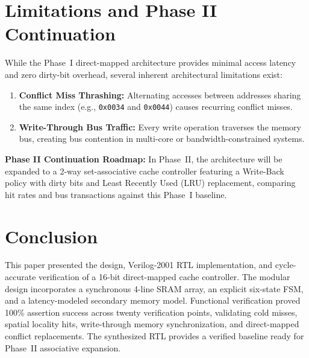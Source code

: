 \documentclass[conference]{IEEEtran}
\begin{document}
\section{Limitations and Phase II Continuation}
While the Phase~I direct-mapped architecture provides minimal access latency and zero dirty-bit overhead, several inherent architectural limitations exist:
\begin{enumerate}
    \item \textbf{Conflict Miss Thrashing:} Alternating accesses between addresses sharing the same index (e.g., \texttt{0x0034} and \texttt{0x0044}) causes recurring conflict misses.
    \item \textbf{Write-Through Bus Traffic:} Every write operation traverses the memory bus, creating bus contention in multi-core or bandwidth-constrained systems.
\end{enumerate}

\textbf{Phase II Continuation Roadmap:}
In Phase~II, the architecture will be expanded to a 2-way set-associative cache controller featuring a Write-Back policy with dirty bits and Least Recently Used (LRU) replacement, comparing hit rates and bus transactions against this Phase~I baseline.

\section{Conclusion}
This paper presented the design, Verilog-2001 RTL implementation, and cycle-accurate verification of a 16-bit direct-mapped cache controller. The modular design incorporates a synchronous 4-line SRAM array, an explicit six-state FSM, and a latency-modeled secondary memory model. Functional verification proved 100\% assertion success across twenty verification points, validating cold misses, spatial locality hits, write-through memory synchronization, and direct-mapped conflict replacements. The synthesized RTL provides a verified baseline ready for Phase~II associative expansion.



\end{document}
